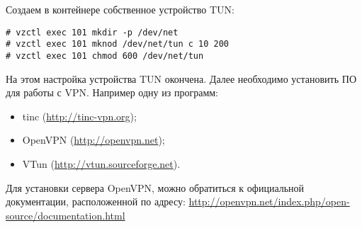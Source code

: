 Создаем в контейнере собственное устройство TUN:
\begin{lstlisting}
# vzctl exec 101 mkdir -p /dev/net
# vzctl exec 101 mknod /dev/net/tun c 10 200
# vzctl exec 101 chmod 600 /dev/net/tun
\end{lstlisting}

На этом настройка устройства TUN окончена.
Далее необходимо установить ПО для работы с VPN.
Например одну из программ:
\begin{itemize}
    \item tinc (\url{http://tinc-vpn.org});
    \item OpenVPN (\url{http://openvpn.net});
    \item VTun (\url{http://vtun.sourceforge.net}).
\end{itemize}

Для установки сервера OpenVPN, можно обратиться к официальной документации, расположенной по адресу: \url{http://openvpn.net/index.php/open-source/documentation.html}

\clearpage
